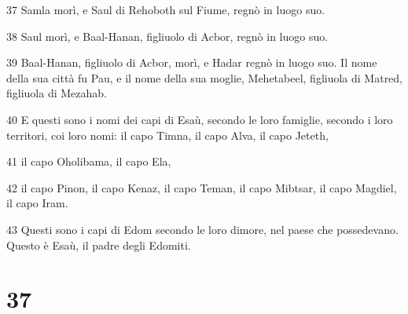 \par 37 Samla morì, e Saul di Rehoboth sul Fiume, regnò in luogo suo.
\par 38 Saul morì, e Baal-Hanan, figliuolo di Acbor, regnò in luogo suo.
\par 39 Baal-Hanan, figliuolo di Acbor, morì, e Hadar regnò in luogo suo. Il nome della sua città fu Pau, e il nome della sua moglie, Mehetabeel, figliuola di Matred, figliuola di Mezahab.
\par 40 E questi sono i nomi dei capi di Esaù, secondo le loro famiglie, secondo i loro territori, coi loro nomi: il capo Timna, il capo Alva, il capo Jeteth,
\par 41 il capo Oholibama, il capo Ela,
\par 42 il capo Pinon, il capo Kenaz, il capo Teman, il capo Mibtsar, il capo Magdiel, il capo Iram.
\par 43 Questi sono i capi di Edom secondo le loro dimore, nel paese che possedevano. Questo è Esaù, il padre degli Edomiti.

\chapter{37}

